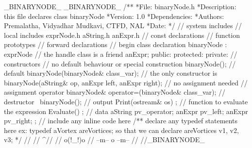 \BeginCppCode
\Hifnde _BINARYNODE_
\Hdefin _BINARYNODE_
{\BBC}/**
\BL
  *File: binaryNode.h
\BL
  *Description:
\BL
   this file declares class binaryNode
\BL
  *Version: 1.0
\BL
  *Dependencies:
\BL
  *Authors: Premalatha, Vidyadhar Mudkavi, CTFD, NAL
\BL
  *Date:
  */{\EBC}
\BL
{\BLC}// system includes{\ELC}
\BL
{\BLC}// local includes{\ELC}
\Hinclud {\dq}exprNode.h{\dq}
\Hinclud {\dq}aString.h{\dq}
\Hinclud {\dq}anExpr.h{\dq}
\BL
{\BLC}// const declarations{\ELC}
\BL
{\BLC}// function prototypes{\ELC}
\BL
{\BLC}// forward declarations{\ELC}
\BL
{\BLC}// begin class declaration{\ELC}
\Clas binaryNode : \Publi exprNode
{\ob}
{\BLC}// the handle class is a friend{\ELC}
   \Frien \Clas anExpr;
\BL
   public:
\BL
   protected:
\BL
   private:
   {\BLC}// constructors{\ELC}
 {\BLC}// no default behaviour or special construction{\ELC}
      binaryNode(); {\BLC}// default{\ELC}
      binaryNode(\Cons binaryNode& class_var);
\Hendi
   {\BLC}// the only constructor is{\ELC}
      binaryNode(\Cons aString& op, anExpr left, anExpr right);
\BL
{} {\BLC}// no assignment needed{\ELC}
   {\BLC}// assignment operator{\ELC}
      binaryNode& operator=(\Cons binaryNode& class_var);
\Hendi
\BL
   {\BLC}// destructor{\ELC}
      ~binaryNode();
\BL
   {\BLC}// output{\ELC}
      \Voi Print(ostream& os) \Cons;
\BL
   {\BLC}// function to evaluate the expression{\ELC}
      \In Evaluate() \Cons;
\BL
   {\BLC}// data{\ELC}
      aString pv_operator;
      anExpr  pv_left;
      anExpr  pv_right;
{\cb};
\BL
{\BLC}// include any inline code here{\ELC}
\BL
{\BBC}/**
   declare any typedef statements here
     ex: typedef aVortex areVortices;
   so that we can declare
     areVortices v1, v2, v3;
  */{\EBC}
                              {\BLC}//                 {\ELC}
                              {\BLC}//      {\bs}{\bs}^//      {\ELC}
                              {\BLC}//     o(!_!)o     {\ELC}
                              {\BLC}// --m--  o  --m-- {\ELC}
                              {\BLC}//                 {\ELC}
\BL
\Hendi {\BLC}//_BINARYNODE_{\ELC}
\EndCppCode

